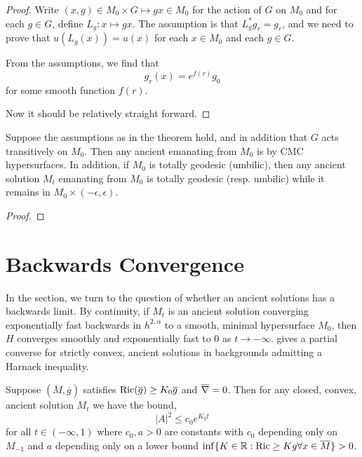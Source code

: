 \documentclass{amsart}
\begin{document}
\begin{proof}
Write \((x, g) \in M_0 \times G \mapsto gx \in M_0\) for the action of \(G\) on \(M_0\) and for each \(g \in G\), define \(L_g : x \mapsto gx\). The assumption is that \(L_g^{\ast} g_r = g_r\), and we need to prove that \(u(L_g(x)) = u(x)\) for each \(x \in M_0\) and each \(g \in G\).

From the assumptions, we find that
\[
g_r(x) = e^{f(r)} g_0
\]
for some smooth function \(f(r)\).

Now it should be relatively straight forward.
\end{proof}

\begin{cor}
Suppose the assumptions as in the theorem hold, and in addition that \(G\) acts transitively on \(M_0\). Then any ancient emanating from \(M_0\) is by CMC hypersurfaces. In addition, if \(M_0\) is totally geodesic (umbilic), then any ancient solution \(M_t\) emanating from \(M_0\) is totally geodesic (resp. umbilic) while it remains in \(M_0 \times (-\epsilon, \epsilon)\).
\end{cor}

\begin{proof}

\end{proof}

\section{Backwards Convergence}
\label{sec:backwards}

In the section, we turn to the question of whether an ancient solutions has a backwards limit. By continuity, if \(M_t\) is an ancient solution converging exponentially fast backwards in \(h^{2,\alpha}\) to a smooth, minimal hypersurface \(M_0\), then \(H\) converges smoothly and exponentially fast to \(0\) as \(t\to-\infty\).  gives a partial converse for strictly convex, ancient solutions in backgrounds admitting a Harnack inequality.

\begin{lemma}
\label{lem:bounded_sff}
Suppose \((\overline{M}, \overline{g})\) satisfies \(\operatorname{Ric}(\overline{g}) \geq K_0 \overline{g}\) and \(\overline{\nabla}\overline{\rm} = 0\). Then for any closed, convex, ancient solution \(M_t\) we have the bound,
\[
|A|^2 \leq c_0 e^{K_0t}
\]
for all \(t \in (-\infty, 1)\) where \(c_0, a > 0\) are constants with \(c_0\) depending only on \(M_{-1}\) and \(a\) depending only on a lower bound \(\inf \{K \in \mathbb{R} : \operatorname{Ric} \geq K g \forall x \in \overline{M}\} > 0\).
\end{lemma}
\end{document}
